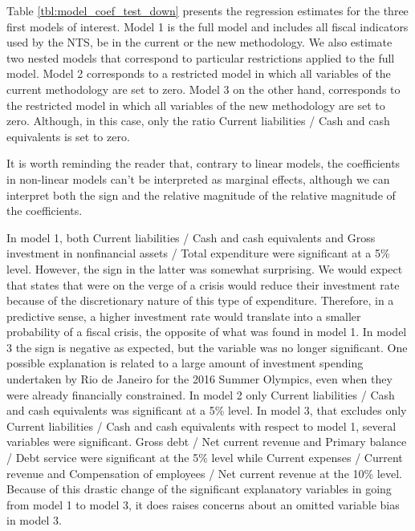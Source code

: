 Table \ref{tbl:model_coef_test_down} presents the regression estimates for the three first models of interest. Model 1 is the full model and includes all fiscal indicators used by the NTS, be in the current or the new methodology. We also estimate two nested models that correspond to particular restrictions applied to the full model. Model 2 corresponds to a restricted model in which all variables of the current methodology are set to zero. Model 3 on the other hand, corresponds to the restricted model in which all variables of the new methodology are set to zero. Although, in this case, only the ratio Current liabilities / Cash and cash equivalents is set to zero.

It is worth reminding the reader that, contrary to linear models, the coefficients in non-linear models can't be interpreted as marginal effects, although we can interpret both the sign and the relative magnitude of the relative magnitude of the coefficients. 

In model 1, both Current liabilities / Cash and cash equivalents and Gross investment in nonfinancial assets / Total expenditure were significant at a 5\% level. However, the sign in the latter was somewhat surprising. We would expect that states that were on the verge of a crisis would reduce their investment rate because of the discretionary nature of this type of expenditure. Therefore, in a predictive sense, a higher investment rate would translate into a smaller probability of a fiscal crisis, the opposite of what was found in model 1. In model 3 the sign is negative as expected, but the variable was no longer significant. One possible explanation is related to a large amount of investment spending undertaken by Rio de Janeiro for the 2016 Summer Olympics, even when they were already financially constrained. In model 2 only Current liabilities / Cash and cash equivalents was significant at a 5\% level. In model 3, that excludes only Current liabilities / Cash and cash equivalents with respect to model 1, several variables were significant. Gross debt / Net current revenue and Primary balance / Debt service were significant at the 5\% level while Current expenses / Current revenue and Compensation of employees / Net current revenue at the 10\% level. Because of this drastic change of the significant explanatory variables in going from model 1 to model 3, it does raises concerns about an omitted variable bias in model 3.

